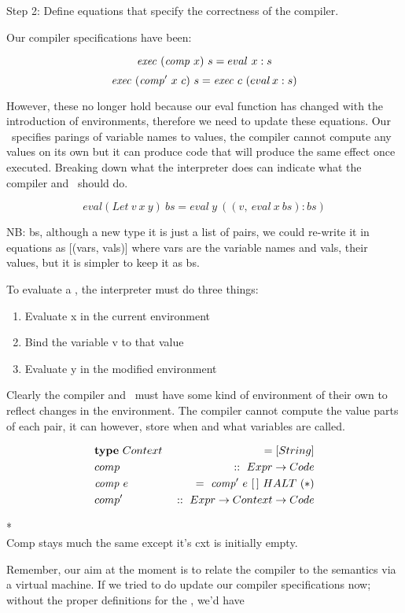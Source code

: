 \documentclass {article}
\begin{document}
Step 2: Define equations that specify the
	correctness of the compiler.

Our compiler specifications have been:

	\[ \mathit{exec\ }  (\mathit{comp\ }  x)\  s = eval\  x:s \]
	\[ \mathit{exec\ }  (\mathit{comp'\ }   x\  c)\ s = \mathit{exec\ }  c\  (eval \, x:s) \]

However, these no longer hold
because our eval function has changed
with the introduction of environments,
therefore we need to update these equations.
\linebreak
Our \env\ specifies parings of 
variable names to values,
the compiler cannot compute any 
values on its own
but it can produce code that will
produce the same effect once executed.
Breaking down what the interpreter
does can indicate what the 
compiler and \vm\ should do.

\[eval(Let\ v\ x\ y)\ bs 
		= eval\ y\ ((v,\ eval\ x\ bs):bs) \]

NB: bs, although a new type it is just a list
of pairs, we could re-write it in equations as
[(vars, vals)] where vars are the variable names
and vals, their values,
but it is simpler to keep it as bs.

To evaluate a , the interpreter
must do three things:
\begin{enumerate}
	\item Evaluate x in the current environment
	\item Bind the variable v to that value
	\item Evaluate y in the modified environment
\end{enumerate}

Clearly the compiler and \vm\ must have some kind of
environment of their own to
reflect changes in the environment.
The compiler cannot compute the value
parts of each pair,
it can however, 
store when and what variables are called.

\begin{eqnarray*}
	&\textbf{type}\  Context\ &= [String] \\
	&comp &::\ Expr \rightarrow Code \\
	&\mathit{comp\ } e &=\ \mathit{comp'\ }  e\ [\,]\ HALT\ (*)\\
	&comp' &::\ Expr \rightarrow Context \rightarrow Code
\end{eqnarray*}

*\\Comp stays much the same except it's cxt
	is initially empty.

Remember, our aim at the moment
is to relate the compiler to the
semantics via a virtual machine.
If we tried to do update our compiler 
specifications now; 
without the proper definitions
for the \vm, we'd have
\end{document}
